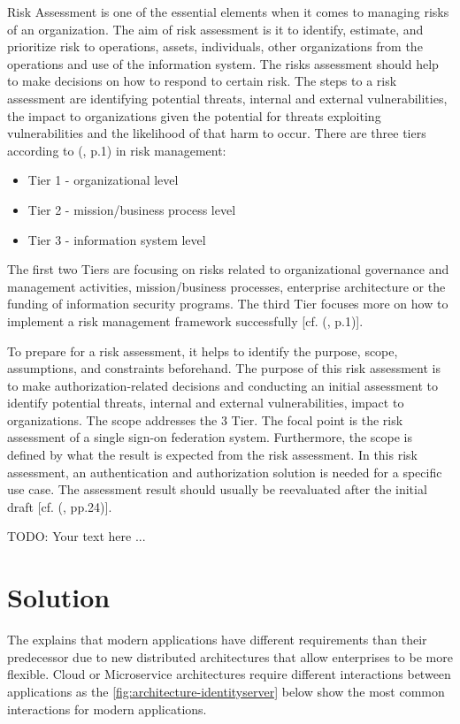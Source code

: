 Risk Assessment is one of the essential elements when it comes to managing risks of an organization. The aim of risk assessment is it to identify, estimate, and prioritize risk to operations, assets, individuals, other organizations from the operations and use of the information system. The risks assessment should help to make decisions on how to respond to certain risk. The steps to a risk assessment are identifying potential threats, internal and external vulnerabilities, the impact to organizations given the potential for threats exploiting vulnerabilities and the likelihood of that harm to occur. There are three tiers according to (\cite{NIST:2012:GCRA}, p.1) in risk management:

\begin{itemize}
	\item Tier 1 - organizational level
	\item Tier 2 - mission/business process level
	\item Tier 3 - information system level
\end{itemize}

The first two Tiers are focusing on risks related to organizational governance and management activities, mission/business processes, enterprise architecture or the funding of information security programs. The third Tier focuses more on how to implement a risk management framework successfully [cf. (\cite{NIST:2012:GCRA}, p.1)]. 

To prepare for a risk assessment, it helps to identify the purpose, scope, assumptions, and constraints beforehand. The purpose of this risk assessment is to make authorization-related decisions and conducting an initial assessment to identify potential threats, internal and external vulnerabilities, impact to organizations. The scope addresses the 3 Tier. The focal point is the risk assessment of a single sign-on federation system. Furthermore, the scope is defined by what the result is expected from the risk assessment. In this risk assessment, an authentication and authorization solution is needed for a specific use case. The assessment result should usually be reevaluated after the initial draft [cf. (\cite{NIST:2012:GCRA}, pp.24)].



TODO: Your text here ...


\section{Solution}
The \cite{Sakimura:2014:OpenIDConnect} explains that modern applications have different requirements than their predecessor due to new distributed architectures that allow enterprises to be more flexible. Cloud or Microservice architectures require different interactions between applications as the \ref{fig:architecture-identityserver} below show the most common interactions for modern applications.

